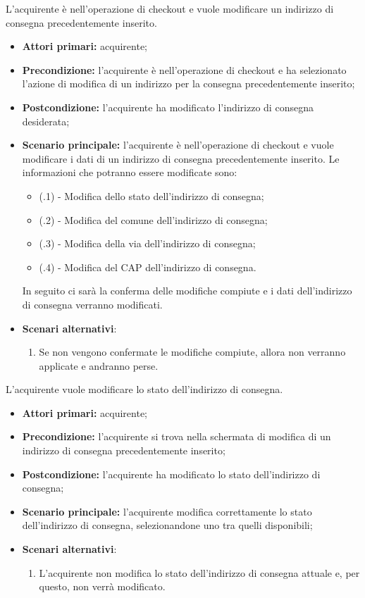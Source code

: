 L'acquirente è nell'operazione di checkout e vuole modificare un indirizzo di consegna precedentemente inserito.
\begin{itemize}
    \item \textbf{Attori primari:} acquirente;
    \item \textbf{Precondizione:} l'acquirente è nell'operazione di checkout e ha selezionato l'azione di modifica di un indirizzo per la consegna precedentemente inserito;
    \item \textbf{Postcondizione:} l'acquirente ha modificato l'indirizzo di consegna desiderata;
    \item \textbf{Scenario principale:} l'acquirente è nell'operazione di checkout e vuole modificare i dati di un indirizzo di consegna precedentemente inserito. Le informazioni che potranno essere modificate sono:
    \begin{itemize}
        \item (\actualUC.1) - Modifica dello stato dell'indirizzo di consegna;
		\item (\actualUC.2) - Modifica del comune dell'indirizzo di consegna;
		\item (\actualUC.3) - Modifica della via dell'indirizzo di consegna;
		\item (\actualUC.4) - Modifica del CAP dell'indirizzo di consegna.
    \end{itemize}
    In seguito ci sarà la conferma delle modifiche compiute e i dati dell'indirizzo di consegna verranno modificati.
    \item \textbf{Scenari alternativi}:
    \begin{enumerate}[label=\lett]
        \item Se non vengono confermate le modifiche compiute, allora non verranno applicate e andranno perse.
    \end{enumerate}
\end{itemize}

\resetSubUC

L'acquirente vuole modificare lo stato dell'indirizzo di consegna.
\begin{itemize}
    \item \textbf{Attori primari:} acquirente;
    \item \textbf{Precondizione:} l'acquirente si trova nella schermata di modifica di un indirizzo di consegna precedentemente inserito;
    \item \textbf{Postcondizione:} l'acquirente ha modificato lo stato dell'indirizzo di consegna;
    \item \textbf{Scenario principale:} l'acquirente modifica correttamente lo stato dell'indirizzo di consegna, selezionandone uno tra quelli disponibili;
    \item \textbf{Scenari alternativi}:
    \begin{enumerate}[label=\lett]
        \item L'acquirente non modifica lo stato dell'indirizzo di consegna attuale e, per questo, non verrà modificato.
    \end{enumerate}
\end{itemize}

